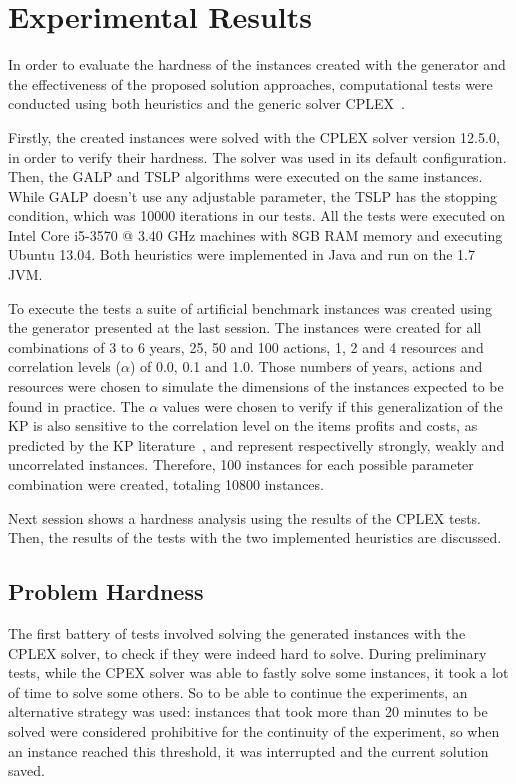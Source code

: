 \section{Experimental Results}
\label{sec:exp_results}

In order to evaluate the hardness of the instances created with the generator and the effectiveness of the proposed
solution approaches, computational tests were conducted using both heuristics and the generic solver CPLEX~\cite{Cplex}.

Firstly, the created instances were solved with the CPLEX solver version 12.5.0, in order to verify their hardness. 
The solver was used in its default configuration. Then, the GALP and TSLP algorithms were executed on the same instances.
While GALP doesn't use any adjustable parameter, the TSLP has the stopping condition, which was 10000 iterations in our
tests. All the tests were executed on Intel Core i5-3570 @ 3.40 GHz machines with 8GB RAM memory and executing Ubuntu 13.04.
Both heuristics were implemented in Java and run on the 1.7 JVM.

To execute the tests a suite of artificial benchmark instances was created using the generator presented at the last session.
The instances were created for all combinations of 3 to 6 years, 25, 50 and 100 actions, 1, 2 and 4 resources and
correlation levels ($\alpha$) of 0.0, 0.1 and 1.0. Those numbers of years, actions and resources were chosen to simulate 
the dimensions of the instances expected to be found in practice. The $\alpha$ values were chosen to verify if this 
generalization of the KP is also sensitive to the correlation level on the items profits and costs, as predicted
by the KP literature~\cite{pisinger2005}, and represent respectivelly strongly, weakly and uncorrelated instances. Therefore, 100 instances 
for each possible parameter combination were created, totaling 10800 instances.

Next session shows a hardness analysis using the results of the CPLEX tests. Then, the results of the tests with
the two implemented heuristics are discussed.

\subsection{Problem Hardness}

The first battery of tests involved solving the generated instances with the CPLEX solver, to check if they were
indeed hard to solve. During preliminary tests, while the CPEX solver was able to fastly solve some instances, it took 
a lot of time to solve some others. So to be able to continue the experiments, an alternative strategy was used: instances
that took more than 20 minutes to be solved were considered prohibitive for the continuity of the experiment, so when an 
instance reached this threshold, it was interrupted and the current solution saved.

